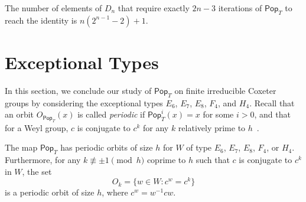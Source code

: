 \documentclass[ALCO,ThmDefs,Unicode,epreuves]{cedram}
\newcommand{\darkblue}{\color{darkblue}}
\newcommand{\defn}[1]{\emph{\darkblue #1}}
\newcommand{\pop}{\mathsf{Pop}}
\begin{document}
\begin{conj}
\label{conj:D}
The number of elements of $D_n$ that require exactly $2n-3$ iterations of $\pop_T$ to reach the identity is $n (2^{n-1}-2)+1$.
\end{conj}



\section{Exceptional Types}

In this section, we conclude our study of $\pop_T$ on finite irreducible Coxeter groups by considering the exceptional types $E_6$, $E_7$, $E_8$, $F_4$, and $H_4$.  Recall that an orbit $O_{\pop_T}(x)$ is called \defn{periodic} if $\pop_T^i(x)=x$ for some $i>0$, and that for a Weyl group, $c$ is conjugate to $c^k$ for any $k$ relatively prime to $h$~\cite{springer1974regular}.


\begin{theorem}
The map $\pop_T$ has periodic orbits of size $h$ for $W$ of type $E_6$, $E_7$, $E_8$, $F_4$, or $H_4$.  Furthermore, for any $k\not\equiv \pm 1 \pmod h$ coprime to $h$ such that $c$ is conjugate to $c^k$ in $W$, the set 
\[
O_k = \{w \in W : c^w = c^k\}
\]
 is a periodic orbit of size $h$, where $c^w = w^{-1}cw$.
\end{theorem}
\end{document}
